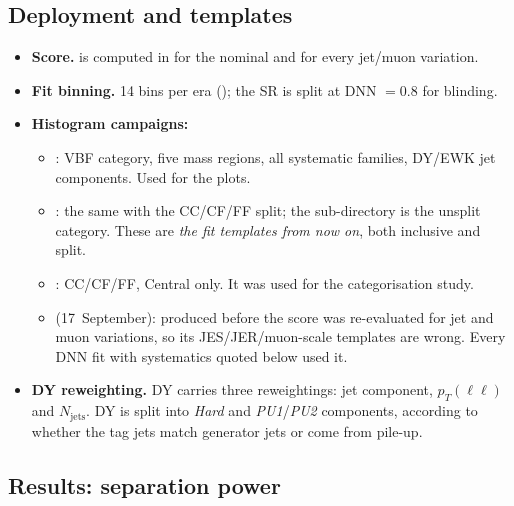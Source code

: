 \documentclass[11pt,a4paper]{article}
\begin{document}
\subsection{Deployment and templates}
\begin{itemize}
  \item \textbf{Score.}  is computed in
   for the nominal and for every jet/muon
  variation.
  \item \textbf{Fit binning.} 14 bins per era ();
  the SR is split at DNN $=0.8$ for blinding.
  \item \textbf{Histogram campaigns:}
  \begin{itemize}
    \item {}: VBF category, five mass regions, all systematic
    families, DY/EWK jet components. Used for the plots.
    \item {}: the same with the CC/CF/FF split;
    the  sub-directory is the unsplit category. These are
    \emph{the fit templates from now on}, both inclusive and split.
    \item {}: CC/CF/FF, Central only. It was used for
    the categorisation study.
    \item {} (17~September): produced before the score
    was re-evaluated for jet and muon variations, so its JES/JER/muon-scale
    templates are wrong. Every DNN fit with systematics quoted below used it.
  \end{itemize}
  \item \textbf{DY reweighting.} DY carries three reweightings: jet component,
  $p_T(\ell\ell)$ and $N_\text{jets}$. DY is split into \emph{Hard} and
  \emph{PU1}/\emph{PU2} components, according to whether the tag jets match
  generator jets or come from pile-up.
\end{itemize}

\subsection{Results: separation power}
\end{document}

